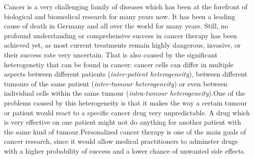 Cancer is a very challenging family of diseases which has been at the forefront of biological and biomedical research for many years now. It has been a leading cause of death in Germany and all over the world for many years. Still, no profound understanding or comprehensive success in cancer therapy has been achieved yet, as most current treatments remain highly dangerous, invasive, or their success rate very uncertain. That is also caused by the significant heterogenetiy that can be found in cancer: cancer cells can differ in multiple aspects between different patients (\textit{inter-patient heterogeneity}), between different tumours of the same patient (\textit{inter-tumour heterogeneity}) or even between individual cells within the same tumour (\textit{intra-tumour heterogeneity}).\addref[heterogeneity]
One of the problems caused by this heterogeneity is that it makes the way a certain tumour or patient would react to a specific cancer drug very unpredictable. A drug which is very effective on one patient might not do anything for another patient with the same kind of tumour.\rewrite[]
Personalized cancer therapy is one of the main goals of cancer research, since it would allow medical practitioners to adminster drugs with a higher probability of success and a lower chance of unwanted side effects.\citep{meric2012overcoming}\\